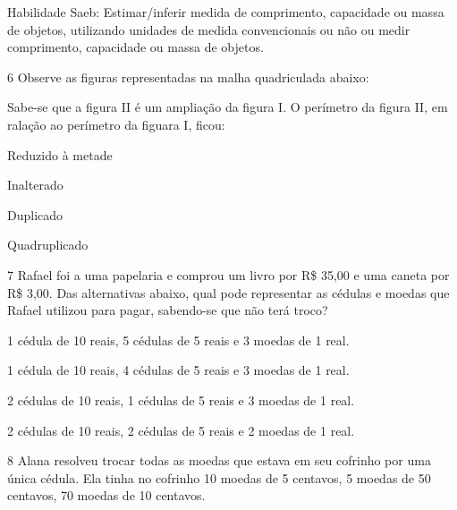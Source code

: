 {{Habilidade Saeb: Estimar/inferir medida de comprimento, capacidade ou
massa de objetos, utilizando unidades de medida convencionais ou não ou
medir comprimento, capacidade ou massa de objetos.}

\num{6} Observe as figuras representadas na malha quadriculada abaixo:


Sabe-se que a figura II é um ampliação da figura I. O perímetro da
figura II, em ralação ao perímetro da figuara I, ficou:

\begin{escolha}
\item
  Reduzido à metade
\item
  Inalterado
\item
  Duplicado
\item
  Quadruplicado
\end{escolha}


\num{7} Rafael foi a uma papelaria e comprou um livro por R\$ 35,00 e uma
caneta por R\$ 3,00. Das alternativas abaixo, qual pode representar as
cédulas e moedas que Rafael utilizou para pagar, sabendo-se que não terá
troco?

\begin{escolha}
\item
  1 cédula de 10 reais, 5 cédulas de 5 reais e 3 moedas de 1 real.
\item
  1 cédula de 10 reais, 4 cédulas de 5 reais e 3 moedas de 1 real.
\item
  2 cédulas de 10 reais, 1 cédulas de 5 reais e 3 moedas de 1 real.
\item
  2 cédulas de 10 reais, 2 cédulas de 5 reais e 2 moedas de 1 real.
\end{escolha}


\num{8} Alana resolveu trocar todas as moedas que estava em seu cofrinho
por uma única cédula. Ela tinha no cofrinho 10 moedas de 5 centavos, 5
moedas de 50 centavos, 70 moedas de 10 centavos.

}
